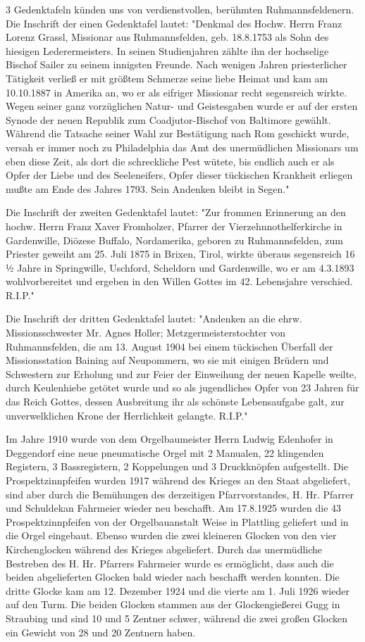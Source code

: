 \documentclass{book}
\begin{document}
3 Gedenktafeln künden uns von verdienstvollen, berühmten Ruhmannsfeldenern. Die
Inschrift der einen Gedenktafel lautet: "Denkmal des Hochw. Herrn Franz Lorenz
Grassl, Missionar aus Ruhmannsfelden, geb. 18.8.1753 als Sohn des hiesigen
Lederermeisters. In seinen Studienjahren zählte ihn der hochselige Bischof
Sailer zu seinem innigsten Freunde. Nach wenigen Jahren priesterlicher Tätigkeit
verließ er mit größtem Schmerze seine liebe Heimat und kam am 10.10.1887 in
Amerika an, wo er als eifriger Missionar recht segensreich wirkte. Wegen seiner
ganz vorzüglichen Natur- und Geistesgaben wurde er auf der ersten Synode der
neuen Republik zum Coadjutor-Bischof von Baltimore gewählt. Während die Tatsache
seiner Wahl zur Bestätigung nach Rom geschickt wurde, versah er immer noch zu
Philadelphia das Amt des unermüdlichen Missionars um eben diese Zeit, als dort
die schreckliche Pest wütete, bis endlich auch er als Opfer der Liebe und des
Seeleneifers, Opfer dieser tückischen Krankheit erliegen mußte am Ende des
Jahres 1793. Sein Andenken bleibt in Segen."

Die Inschrift der zweiten Gedenktafel lautet: "Zur frommen Erinnerung an den
hochw. Herrn Franz Xaver Fromholzer, Pfarrer der Vierzehnnothelferkirche in
Gardenwille, Diözese Buffalo, Nordamerika, geboren zu Ruhmannsfelden, zum
Priester geweiht am 25. Juli 1875 in Brixen, Tirol, wirkte überaus segensreich
16 ½ Jahre in Springwille, Uschford, Scheldorn und Gardenwille, wo er am
4.3.1893 wohlvorbereitet und ergeben in den Willen Gottes im 42. Lebensjahre
verschied. R.I.P."

Die Inschrift der dritten Gedenktafel lautet: "Andenken an die ehrw.
Missionsschwester Mr. Agnes Holler; Metzgermeisterstochter von Ruhmannsfelden,
die am 13. August 1904 bei einem tückischen Überfall der Missionsstation Baining
auf Neupommern, wo sie mit einigen Brüdern und Schwestern zur Erholung und zur
Feier der Einweihung der neuen Kapelle weilte, durch Keulenhiebe getötet wurde
und so als jugendliches Opfer von 23 Jahren für das Reich Gottes, dessen
Ausbreitung ihr als schönste Lebensaufgabe galt, zur unverwelklichen Krone der
Herrlichkeit gelangte. R.I.P."

 Im Jahre 1910 wurde von dem Orgelbaumeister Herrn Ludwig Edenhofer in
 Deggendorf eine neue pneumatische Orgel mit 2 Manualen, 22 klingenden
 Registern, 3 Bassregistern, 2 Koppelungen und 3 Druckknöpfen aufgestellt. Die
 Prospektzinnpfeifen wurden 1917 während des Krieges an den Staat abgeliefert,
 sind aber durch die Bemühungen des derzeitigen Pfarrvorstandes, H. Hr. Pfarrer
 und Schuldekan Fahrmeier wieder neu beschafft. Am 17.8.1925 wurden die 43
 Prospektzinnpfeifen von der Orgelbauanstalt Weise in Plattling geliefert und in
 die Orgel eingebaut. Ebenso wurden die zwei kleineren Glocken von den vier
 Kirchenglocken während des Krieges abgeliefert. Durch das unermüdliche
 Bestreben des H. Hr. Pfarrers Fahrmeier wurde es ermöglicht, dass auch die
 beiden abgelieferten Glocken bald wieder nach beschafft werden konnten. Die
 dritte Glocke kam am 12. Dezember 1924 und die vierte am 1. Juli 1926 wieder
 auf den Turm. Die beiden Glocken stammen aus der Glockengießerei Gugg in
 Straubing und sind 10 und 5 Zentner schwer, während die zwei großen Glocken ein
 Gewicht von 28 und 20 Zentnern haben.
\end{document}
